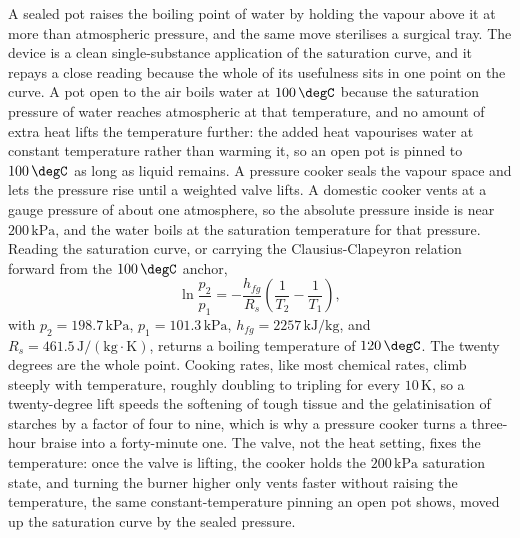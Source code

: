 A sealed pot raises the boiling point of water by holding the vapour above
it at more than atmospheric pressure, and the same move sterilises a surgical
tray. The device is a clean single-substance application of the saturation
curve, and it repays a close reading because the whole of its usefulness
sits in one point on the curve. A pot open to the air boils water at
$100\,\degC$ because the saturation pressure of water reaches atmospheric at
that temperature, and no amount of extra heat lifts the temperature further:
the added heat vapourises water at constant temperature rather than warming
it, so an open pot is pinned to $100\,\degC$ as long as liquid remains. A
pressure cooker seals the vapour space and lets the pressure rise until a
weighted valve lifts. A domestic cooker vents at a gauge pressure of about
one atmosphere, so the absolute pressure inside is near $200\,\text{kPa}$,
and the water boils at the saturation temperature for that pressure. Reading
the saturation curve, or carrying the Clausius-Clapeyron relation forward
from the $100\,\degC$ anchor,
\[
\ln\frac{p_2}{p_1} = -\frac{h_{fg}}{R_s}\left(\frac{1}{T_2} -
\frac{1}{T_1}\right),
\]
with $p_2 = 198.7\,\text{kPa}$, $p_1 = 101.3\,\text{kPa}$, $h_{fg} =
2257\,\text{kJ}/\text{kg}$, and $R_s = 461.5\,\text{J}/(\text{kg}\cdot
\si{\kelvin})$, returns a boiling temperature of $120\,\degC$. The twenty
degrees are the whole point. Cooking rates, like most chemical rates, climb
steeply with temperature, roughly doubling to tripling for every
$10\,\si{\kelvin}$, so a twenty-degree lift speeds the softening of tough
tissue and the gelatinisation of starches by a factor of four to nine, which
is why a pressure cooker turns a three-hour braise into a forty-minute one.
The valve, not the heat setting, fixes the temperature: once the valve is
lifting, the cooker holds the $200\,\text{kPa}$ saturation state, and turning
the burner higher only vents faster without raising the temperature, the
same constant-temperature pinning an open pot shows, moved up the saturation
curve by the sealed pressure.

